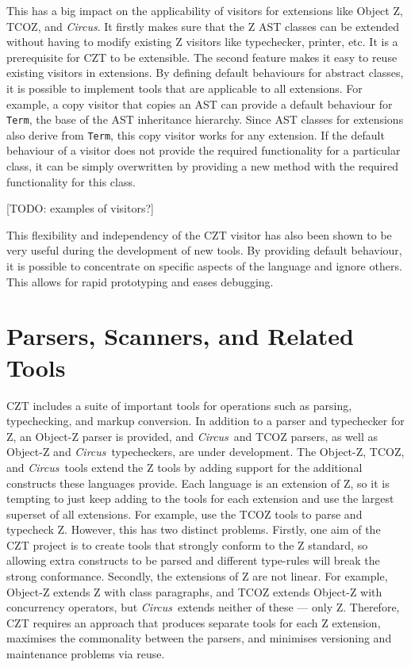 \documentclass{llncs}
\newcommand{\Circus}{{\sf\slshape Circus}}
\newcommand{\Interface}[1]{\texttt{#1}}
\begin{document}
  This has a big impact on the applicability of visitors for
  extensions like Object Z, TCOZ, and \Circus.  It firstly makes sure
  that the Z AST classes can be extended without having to modify
  existing Z visitors like typechecker, printer, etc.  It is a
  prerequisite for CZT to be extensible.  The second feature makes it
  easy to reuse existing visitors in extensions.  By defining default
  behaviours for abstract classes, it is possible to implement tools
  that are applicable to all extensions.  For example, a copy visitor
  that copies an AST can provide a default behaviour for
  \Interface{Term}, the base of the AST inheritance hierarchy.  Since
  AST classes for extensions also derive from \Interface{Term}, this
  copy visitor works for any extension.  If the default behaviour of a
  visitor does not provide the required functionality for a particular
  class, it can be simply overwritten by providing a new method with
  the required functionality for this class.

  [TODO: examples of visitors?]

  This flexibility and independency of the CZT visitor has also been
  shown to be very useful during the development of new tools.  By
  providing default behaviour, it is possible to concentrate on
  specific aspects of the language and ignore others.  This allows for
  rapid prototyping and eases debugging.

\section{Parsers, Scanners, and Related Tools}
\label{parsers}

  CZT includes a suite of important tools for operations such as
  parsing, typechecking, and markup conversion. In addition to a
  parser and typechecker for Z, an Object-Z parser is provided, and
  \Circus\ and TCOZ parsers, as well as Object-Z and \Circus\
  typecheckers, are under development.  The Object-Z, TCOZ, and
  \Circus\ tools extend the Z tools by adding support for the
  additional constructs these languages provide.  Each language is an
  extension of Z, so it is tempting to just keep adding to the tools
  for each extension and use the largest superset of all
  extensions. For example, use the TCOZ tools to parse and typecheck
  Z. However, this has two distinct problems. Firstly, one aim of the
  CZT project is to create tools that strongly conform to the Z
  standard, so allowing extra constructs to be parsed and different
  type-rules will break the strong conformance. Secondly, the
  extensions of Z are not linear. For example, Object-Z extends Z with
  class paragraphs, and TCOZ extends Object-Z with concurrency
  operators, but \Circus\ extends neither of these --- only
  Z. Therefore, CZT requires an approach that produces separate tools
  for each Z extension, maximises the commonality between the parsers,
  and minimises versioning and maintenance problems via reuse.
\end{document}
